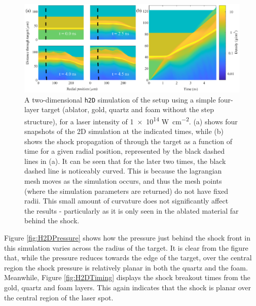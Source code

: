 \begin{figure}[hbt!]
\centering
\includegraphics[width=1\textwidth]{figures/Experiment/H2DPlot.eps}%
\caption{\label{fig:H2DPlot} A two-dimensional \texttt{h2D} simulation of the setup using a simple four-layer target (ablator, gold, quartz and foam without the step structure), for a laser intensity of \num{1e14} \unit{\W\per\centi\meter\squared}. (a) shows four snapshots of the 2D simulation at the indicated times, while (b) shows the shock propagation of through the target as a function of time for a given radial position, represented by the black dashed lines in (a). It can be seen that for the later two times, the black dashed line is noticeably curved. This is because the lagrangian mesh moves as the simulation occurs, and thus the mesh points (where the simulation parameters are returned) do not have fixed radii. This small amount of curvature does not significantly affect the results - particularly as it is only seen in the ablated material far behind the shock.}
\end{figure}

Figure \ref{fig:H2DPressure} shows how the pressure just behind the shock front in this simulation varies across the radius of the target. It is clear from the figure that, while the pressure reduces towards the edge of the target, over the central region the shock pressure is relatively planar in both the quartz and the foam. Meanwhile, Figure \ref{fig:H2DTiming} displays the shock breakout times from the gold, quartz and foam layers. This again indicates that the shock is planar over the central region of the laser spot.

